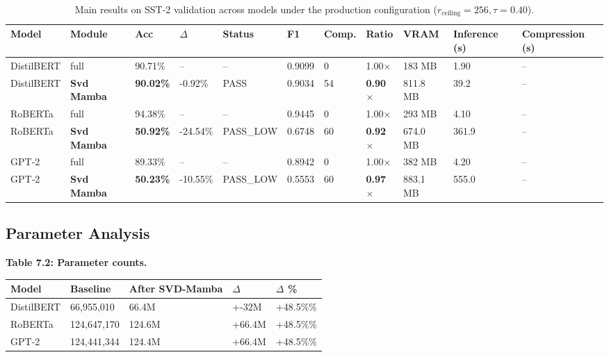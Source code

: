 \begin{table}[t]
\centering
\small
\begin{tabular}{lllllllllll}
\toprule
\textbf{Model} & \textbf{Module} & \textbf{Acc} & \textbf{$\Delta$} & \textbf{Status} & \textbf{F1} & \textbf{Comp.} & \textbf{Ratio} & \textbf{VRAM} & \textbf{Inference (s)} & \textbf{Compression (s)} \\
\midrule
DistilBERT & full & 90.71\% & -- & -- & 0.9099 & 0 & 1.00$\times$ & 183 MB & 1.90 & -- \\
DistilBERT & \textbf{Svd Mamba} & \textbf{90.02\%} & -0.92\% & PASS & 0.9034 & 54 & \textbf{0.90$\times$} & 811.8 MB & 39.2 & -- \\
RoBERTa & full & 94.38\% & -- & -- & 0.9445 & 0 & 1.00$\times$ & 293 MB & 4.10 & -- \\
RoBERTa & \textbf{Svd Mamba} & \textbf{50.92\%} & -24.54\% & PASS_LOW & 0.6748 & 60 & \textbf{0.92$\times$} & 674.0 MB & 361.9 & -- \\
GPT-2 & full & 89.33\% & -- & -- & 0.8942 & 0 & 1.00$\times$ & 382 MB & 4.20 & -- \\
GPT-2 & \textbf{Svd Mamba} & \textbf{50.23\%} & -10.55\% & PASS_LOW & 0.5553 & 60 & \textbf{0.97$\times$} & 883.1 MB & 555.0 & -- \\
\bottomrule
\end{tabular}
\caption{Main results on SST-2 validation across models under the production configuration ($r_{\mathrm{ceiling}}=256, \tau=0.40$).}
\label{tab:main_sst2}
\end{table}

\subsection{Parameter Analysis}

\textbf{Table 7.2: Parameter counts.}

\begin{table}[H]
\centering
\small
\begin{tabular}{lllll}
\toprule
\textbf{Model} & \textbf{Baseline} & \textbf{After SVD-Mamba} & \textbf{$\Delta$} & \textbf{$\Delta$ \%} \\
\midrule
DistilBERT & 66,955,010 & 66.4M & +-32M & +48.5\%\% \\
RoBERTa & 124,647,170 & 124.6M & +66.4M & +48.5\%\% \\
GPT-2 & 124,441,344 & 124.4M & +66.4M & +48.5\%\% \\
\bottomrule
\end{tabular}
\end{table}


